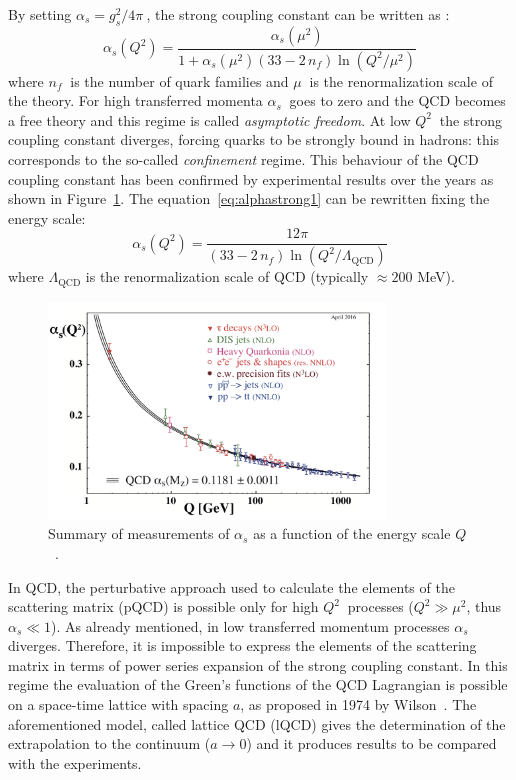 By setting $\alpha_{s} = g^{2}_{s}/4\pi\ $, the strong coupling constant can be written as \cite{pdg}:
\begin{equation} \label{eq:alphastrong1}
    \alpha_{s}(Q^{2}) = \frac{\alpha_{s}(\mu^{2})}{1 + \alpha_{s}(\mu^{2})(33 - 2\,n_{f})
    \ln(Q^{2}/\mu^{2})}
\end{equation}
where $n_{f}\ $ is the number of quark families and $\mu\ $ is the renormalization scale of 
the theory.
For high transferred momenta $\alpha_{s}\ $ goes to zero and the QCD becomes a free theory and 
this regime is called \textit{asymptotic freedom}. At low $Q^{2}\ $ the strong coupling constant diverges,
forcing quarks to be strongly bound in hadrons: this corresponds to the so-called \textit{confinement} regime. 
This behaviour of the QCD coupling constant has been confirmed by experimental results over the
years as shown in Figure~\ref{fig:alpharun}.
The equation~\ref{eq:alphastrong1} can be rewritten fixing the energy scale:
\begin{equation} \label{eq:alphastrong2}
    \alpha_{s}(Q^{2}) = \frac{12 \pi}{(33 - 2\,n_{f})\ln(Q^{2}/\Lambda_{\mathrm{QCD}})}
\end{equation}
where $\Lambda_{\mathrm{QCD}}$ is the renormalization scale of QCD (typically $\approx 200$ MeV).

\begin{figure}
    \captionsetup{justification=centering}
    \centering
    \includegraphics[width=0.8\textwidth]{gfx/alpharun}
	\caption{Summary of measurements of $\alpha_{s}$ as a function of the energy scale $Q$~\cite{pdg}.}
	\label{fig:alpharun}
\end{figure}

In QCD, the perturbative approach used to calculate the elements of the scattering matrix (pQCD) is 
possible only for high $Q^{2}\ $ processes ($Q^{2} \gg \mu^{2}$, thus $\alpha_{s} \ll 1$).
As already mentioned, in low transferred momentum processes $\alpha_{s}$ diverges. 
Therefore, it is impossible to express the elements of the scattering matrix in terms of power series
expansion of the strong coupling constant.
In this regime the evaluation of the Green’s functions of the QCD Lagrangian is possible
on a space-time lattice with spacing $a$, as proposed in 1974 by Wilson~\cite{lattice}.
The aforementioned model, called lattice QCD (lQCD) gives the determination of the extrapolation to 
the continuum ($a \rightarrow 0$) and it produces results to be compared with the experiments.

